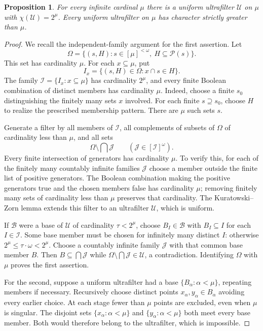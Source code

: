\documentclass[11pt,a4paper]{amsart}
\newtheorem{proposition}[theorem]{Proposition}
\theoremstyle{definition}
\theoremstyle{remark}
\newcommand{\U}{\mathcal U}
\newcommand{\B}{\mathcal B}
\begin{document}
\begin{proposition}\label{prop:uniform}
For every infinite cardinal $\mu$ there is a uniform ultrafilter $\U$ on $\mu$ with $\chi(\U)=2^\mu$. Every uniform ultrafilter on $\mu$ has character strictly greater than $\mu$.
\end{proposition}
\begin{proof}
We recall the independent-family argument for the first assertion. Let
\[
\Omega=\{(s,H):s\in[\mu]^{<\omega},\ H\subseteq\mathcal P(s)\}.
\]
This set has cardinality $\mu$. For each $x\subseteq\mu$, put
\[
I_x=\{(s,H)\in\Omega:x\cap s\in H\}.
\]
The family $\mathcal I=\{I_x:x\subseteq\mu\}$ has cardinality $2^\mu$, and every finite Boolean combination of distinct members has cardinality $\mu$. Indeed, choose a finite $s_0$ distinguishing the finitely many sets $x$ involved. For each finite $s\supseteq s_0$, choose $H$ to realize the prescribed membership pattern. There are $\mu$ such sets $s$.

Generate a filter by all members of $\mathcal I$, all complements of subsets of $\Omega$ of cardinality less than $\mu$, and all sets
\[
\Omega\setminus\bigcap\mathcal J
\qquad(\mathcal J\in[\mathcal I]^\omega).
\]
Every finite intersection of generators has cardinality $\mu$. To verify this, for each of the finitely many countably infinite families $\mathcal J$ choose a member outside the finite list of positive generators. The Boolean combination making the positive generators true and the chosen members false has cardinality $\mu$; removing finitely many sets of cardinality less than $\mu$ preserves that cardinality. The Kuratowski--Zorn lemma extends this filter to an ultrafilter $\U$, which is uniform.

If $\B$ were a base of $\U$ of cardinality $\tau<2^\mu$, choose $B_I\in\B$ with $B_I\subseteq I$ for each $I\in\mathcal I$. Some base member must be chosen for infinitely many distinct $I$: otherwise $2^\mu\leqslant\tau\cdot\omega<2^\mu$. Choose a countably infinite family $\mathcal J$ with that common base member $B$. Then $B\subseteq\bigcap\mathcal J$ while $\Omega\setminus\bigcap\mathcal J\in\U$, a contradiction. Identifying $\Omega$ with $\mu$ proves the first assertion.

For the second, suppose a uniform ultrafilter had a base $\{B_\alpha:\alpha<\mu\}$, repeating members if necessary. Recursively choose distinct points $x_\alpha,y_\alpha\in B_\alpha$ avoiding every earlier choice. At each stage fewer than $\mu$ points are excluded, even when $\mu$ is singular. The disjoint sets $\{x_\alpha:\alpha<\mu\}$ and $\{y_\alpha:\alpha<\mu\}$ both meet every base member. Both would therefore belong to the ultrafilter, which is impossible.
\end{proof}
\end{document}
